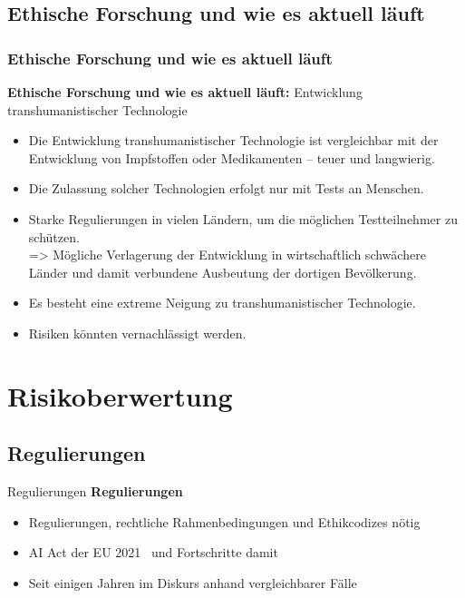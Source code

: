 \documentclass[aspectratio=169,16pt,xcolor=table]{beamer}
\begin{document}
\subsection{Ethische Forschung und wie es aktuell läuft}
\begin{frame}
  \frametitle{Ethische Forschung und wie es aktuell läuft}
  \textbf{Ethische Forschung und wie es aktuell läuft:}
  Entwicklung transhumanistischer Technologie
  \begin{itemize}
    \item Die Entwicklung transhumanistischer Technologie ist vergleichbar mit der Entwicklung von Impfstoffen oder Medikamenten – teuer und langwierig.
    \item Die Zulassung solcher Technologien erfolgt nur mit Tests an Menschen.
    \item Starke Regulierungen in vielen Ländern, um die möglichen Testteilnehmer zu schützen.\\
    => Mögliche Verlagerung der Entwicklung in wirtschaftlich schwächere Länder und damit verbundene Ausbeutung der dortigen Bevölkerung.
  \end{itemize}
\end{frame}

\begin{frame}
  \begin{itemize}
      \item Es besteht eine extreme Neigung zu transhumanistischer Technologie.
      \item Risiken könnten vernachlässigt werden.
  \end{itemize}
\end{frame}

\section{Risikoberwertung}
\subsection{Regulierungen}
\begin{frame}{Regulierungen}
    \textbf{Regulierungen}
    \begin{itemize}
      \item{Regulierungen, rechtliche Rahmenbedingungen und Ethikcodizes nötig}
      \item{AI Act der EU 2021~\cite{ai_act_eu_2021} und Fortschritte damit~\cite{ai_act_deal_2023}}
      \item{Seit einigen Jahren im Diskurs anhand vergleichbarer Fälle~\cite{lee2016cochlear}}
    \end{itemize}
\end{frame}
\end{document}
